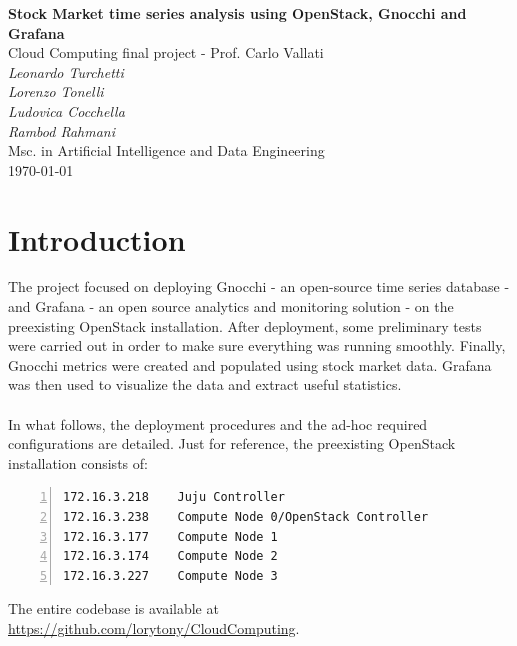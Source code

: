 \documentclass[11pt,a4paper]{article}
\begin{document}
\begin{center}
	\Large\textbf{Stock Market time series analysis using OpenStack, Gnocchi and Grafana}\\
	\vspace{0.2cm}
	\large{Cloud Computing final project - Prof. Carlo Vallati}\\
	\vspace{1.0cm}
	\large\textit{Leonardo Turchetti}\\
	\large\textit{Lorenzo Tonelli}\\
	\large\textit{Ludovica Cocchella}\\
	\large\textit{Rambod Rahmani}\\
	\vspace{0.2cm}
	\normalsize{Msc. in Artificial Intelligence and Data Engineering}\\
	\vspace{1.0cm}
	\today
\end{center}
\vspace{1cm}
\tableofcontents
\vspace{1cm}
\section{Introduction}
The project focused on deploying Gnocchi - an open-source time series database - and Grafana - an open source analytics and monitoring solution - on the preexisting OpenStack installation. After deployment, some preliminary tests were carried out in order to make sure everything was running smoothly. Finally, Gnocchi metrics were created and populated using stock market data. Grafana was then used to visualize the data and extract useful statistics.\\
\\
In what follows, the deployment procedures and the ad-hoc required configurations are detailed. Just for reference, the preexisting OpenStack installation consists of:
\begin{lstlisting}[numbers=left]
172.16.3.218    Juju Controller
172.16.3.238    Compute Node 0/OpenStack Controller
172.16.3.177    Compute Node 1
172.16.3.174    Compute Node 2
172.16.3.227    Compute Node 3
\end{lstlisting}
The entire codebase is available at \url{https://github.com/lorytony/CloudComputing}.
\end{document}
